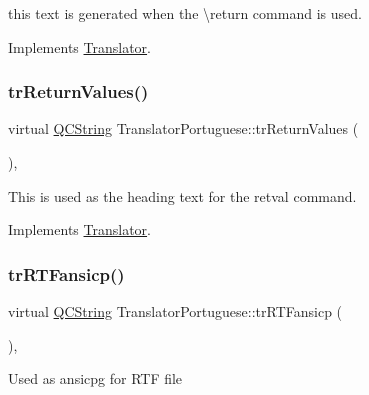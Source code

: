 this text is generated when the \textbackslash{}return command is used. 

Implements \mbox{\hyperlink{class_translator}{Translator}}.

\mbox{\label{class_translator_portuguese_ac68e39b588ad262e332b86eb9af5f77e}} 
\subsubsection{\texorpdfstring{trReturnValues()}{trReturnValues()}}
{\footnotesize\ttfamily virtual \mbox{\hyperlink{class_q_c_string}{Q\+C\+String}} Translator\+Portuguese\+::tr\+Return\+Values (\begin{DoxyParamCaption}{ }\end{DoxyParamCaption})\hspace{0.3cm}{\ttfamily [inline]}, {\ttfamily [virtual]}}

This is used as the heading text for the retval command. 

Implements \mbox{\hyperlink{class_translator}{Translator}}.

\mbox{\label{class_translator_portuguese_aebdebcd3a2bcbb38b22b98a7fc92af79}} 
\subsubsection{\texorpdfstring{trRTFansicp()}{trRTFansicp()}}
{\footnotesize\ttfamily virtual \mbox{\hyperlink{class_q_c_string}{Q\+C\+String}} Translator\+Portuguese\+::tr\+R\+T\+Fansicp (\begin{DoxyParamCaption}{ }\end{DoxyParamCaption})\hspace{0.3cm}{\ttfamily [inline]}, {\ttfamily [virtual]}}

Used as ansicpg for R\+TF file

